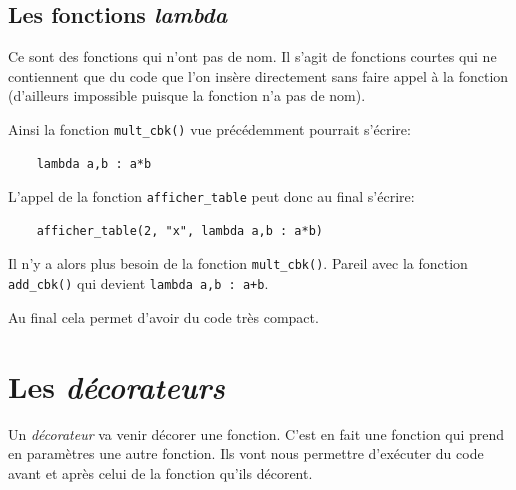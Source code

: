\documentclass[a4paper,11pt]{book}
\begin{document}
\subsection*{Les fonctions \textit{lambda}}
Ce sont des fonctions qui n'ont pas de nom. Il s'agit de fonctions courtes qui ne contiennent que du code que l'on insère directement sans faire appel à la fonction (d'ailleurs impossible puisque la fonction n'a pas de nom).
\medskip

Ainsi la fonction \verb|mult_cbk()| vue précédemment pourrait s'écrire:
\begin{verbatim}
    lambda a,b : a*b
\end{verbatim}
\medskip

L'appel de la fonction \texttt{afficher\_table} peut donc au final s'écrire:
\begin{verbatim}
    afficher_table(2, "x", lambda a,b : a*b)
\end{verbatim}
\medskip

Il n'y a alors plus besoin de la fonction \texttt{mult\_cbk()}. Pareil avec la fonction \texttt{add\_cbk()} qui devient \texttt{lambda a,b : a+b}.
\medskip

Au final cela permet d'avoir du code très compact.
\medskip

\section{Les \textit{décorateurs}}
Un \textit{décorateur} va venir décorer une fonction. C'est en fait une fonction qui prend en paramètres une autre fonction. Ils vont nous permettre d'exécuter du code avant et après celui de la fonction qu'ils décorent.
\medskip
\end{document}
